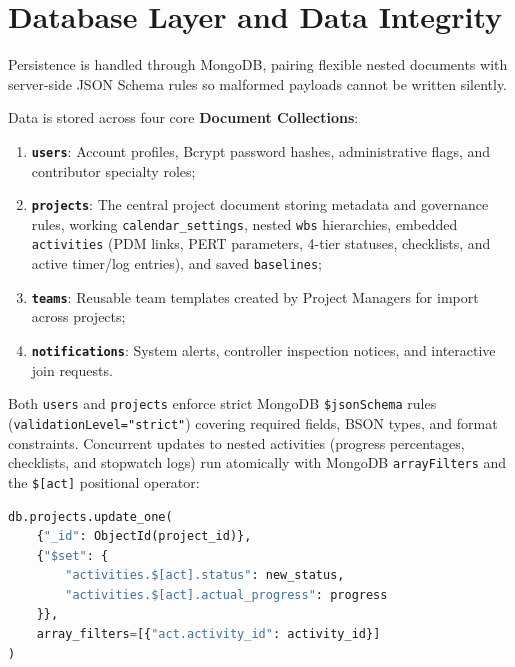\newpage

\section{Database Layer and Data Integrity}
Persistence is handled through MongoDB, pairing flexible nested documents with server-side JSON Schema rules so malformed payloads cannot be written silently.

\noindent Data is stored across four core \textbf{Document Collections}:
\begin{enumerate}[leftmargin=*,itemsep=0pt,topsep=1pt,parsep=0pt]
    \item \textbf{\texttt{users}}: Account profiles, Bcrypt password hashes, administrative flags, and contributor specialty roles;
    
    \vspace{1mm}
    
    \item \textbf{\texttt{projects}}: The central project document storing metadata and governance rules, working \texttt{calendar\_settings}, nested \texttt{wbs} hierarchies, embedded \texttt{activities} (PDM links, PERT parameters, 4-tier statuses, checklists, and active timer/log entries), and saved \texttt{baselines};
    
    \vspace{1mm}
    
    \item \textbf{\texttt{teams}}: Reusable team templates created by Project Managers for import across projects;
    
    \vspace{1mm}
    
    \item \textbf{\texttt{notifications}}: System alerts, controller inspection notices, and interactive join requests.
\end{enumerate}

\vspace{4mm}

Both \texttt{users} and \texttt{projects} enforce strict MongoDB \texttt{\$jsonSchema} rules (\texttt{validationLevel=\allowbreak "strict"}) covering required fields, BSON types, and format constraints. Concurrent updates to nested activities (progress percentages, checklists, and stopwatch logs) run atomically with MongoDB \texttt{arrayFilters} and the \texttt{\$[act]} positional operator:
\begin{lstlisting}[language=Python, basicstyle=\ttfamily\scriptsize, frame=single, aboveskip=3pt, belowskip=3pt]
db.projects.update_one(
    {"_id": ObjectId(project_id)},
    {"$set": {
        "activities.$[act].status": new_status,
        "activities.$[act].actual_progress": progress
    }},
    array_filters=[{"act.activity_id": activity_id}]
)

\end{lstlisting}

